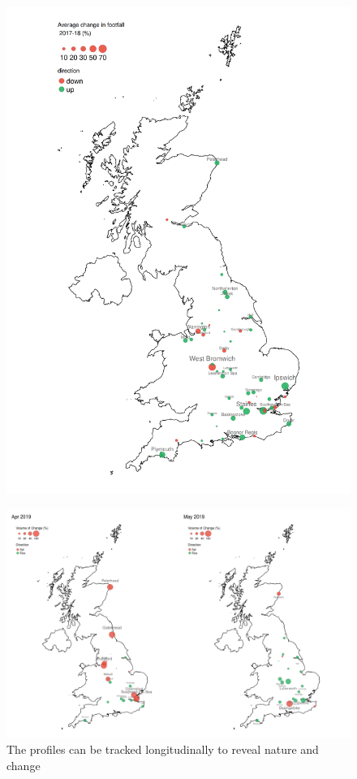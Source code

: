 \begin{figure}
  \includegraphics[trim={0 0 0 0},clip]{images/applications-cities-rank.png}
  \caption{}
  \label{}
\end{figure}

\begin{figure}
  \includegraphics[trim={0 12 0 0},clip]{images/applications-city-indices.png}
  \caption{The profiles can be tracked longitudinally to reveal nature and change}
  \label{}
\end{figure}

